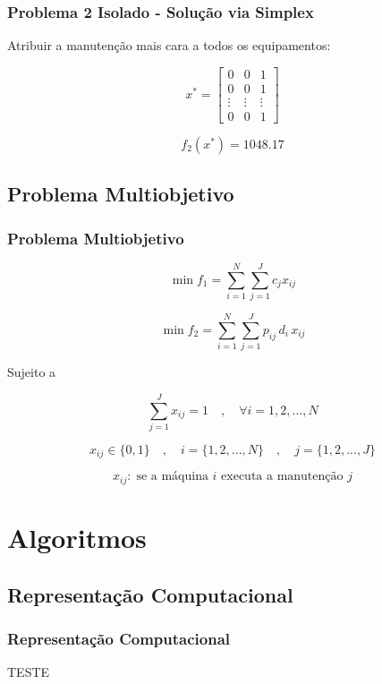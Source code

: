 \documentclass{beamer}
\newcommand{\un}[1]{\;\text{#1}}
\begin{document}
    \begin{frame}
        \frametitle{Problema 2 Isolado - Solução via Simplex}

        \begin{center}
            Atribuir a manutenção mais cara a todos os equipamentos:
        \end{center}

        \[ x^{*} = \begin{bmatrix} 
            0 & 0 & 1 \\
            0 & 0 & 1 \\
            \vdots & \vdots & \vdots \\
            0 &  0      & 1 
            \end{bmatrix} \]

        \vspace{1cm}

       \[ f_2\left(x^{*}\right) = 1048.17 \]
    \end{frame}

    \subsection{Problema Multiobjetivo}
    \begin{frame}
        \frametitle{Problema Multiobjetivo}

        \[  \min f_1 = \sum_{i=1}^{N} \sum_{j=1}^{J} c_j x_{ij} \]

        \[  \min f_2 = \sum_{i=1}^{N} \sum_{j=1}^{J} p_{ij} \, d_i \, x_{ij} \]

        Sujeito a 

        \[ \sum_{j=1}^{J} x_{ij} = 1 \quad , \quad \forall i = {1, 2, ..., N} \]

        \[ x_{ij} \in \{0,1\} \quad , \quad i = \{1, 2, ..., N\}  \quad , \quad j = \{1, 2, ..., J\} \]

        \[  x_{ij}: \un{se a máquina $i$ executa a manutenção $j$}  \]

    \end{frame}

\section{Algoritmos}

\subsection{Representação Computacional}
    \begin{frame}
        \frametitle{Representação Computacional}

        \begin{center}
            TESTE
        \end{center}
    \end{frame}
\end{document}

